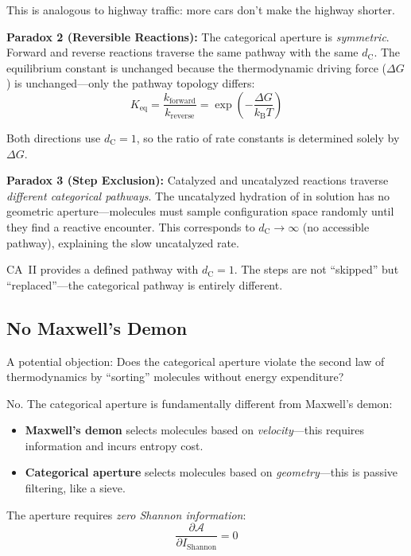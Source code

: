 \documentclass[twocolumn,amsmath,amssymb,aps,prb,superscriptaddress,longbibliography]{revtex4-2}
\newcommand{\dC}{d_{\mathrm{C}}}
\newcommand{\kB}{k_{\mathrm{B}}}
\newcommand{\calA}{\mathcal{A}}
\begin{document}
This is analogous to highway traffic: more cars don't make the highway shorter.

\textbf{Paradox 2 (Reversible Reactions):} The categorical aperture is \emph{symmetric}. Forward and reverse reactions traverse the same pathway with the same $\dC$. The equilibrium constant is unchanged because the thermodynamic driving force ($\Delta G$) is unchanged---only the pathway topology differs:
\begin{equation}
K_{\text{eq}} = \frac{k_{\text{forward}}}{k_{\text{reverse}}} = \exp\left(-\frac{\Delta G}{\kB T}\right)
\end{equation}

Both directions use $\dC = 1$, so the ratio of rate constants is determined solely by $\Delta G$.

\textbf{Paradox 3 (Step Exclusion):} Catalyzed and uncatalyzed reactions traverse \emph{different categorical pathways}. The uncatalyzed hydration of  in solution has no geometric aperture---molecules must sample configuration space randomly until they find a reactive encounter. This corresponds to $\dC \to \infty$ (no accessible pathway), explaining the slow uncatalyzed rate.

CA~II provides a defined pathway with $\dC = 1$. The steps are not ``skipped'' but ``replaced''---the categorical pathway is entirely different.

\subsection{No Maxwell's Demon}

A potential objection: Does the categorical aperture violate the second law of thermodynamics by ``sorting'' molecules without energy expenditure?

No. The categorical aperture is fundamentally different from Maxwell's demon:
\begin{itemize}
\item \textbf{Maxwell's demon} selects molecules based on \emph{velocity}---this requires information and incurs entropy cost.
\item \textbf{Categorical aperture} selects molecules based on \emph{geometry}---this is passive filtering, like a sieve.
\end{itemize}

The aperture requires \emph{zero Shannon information}:
\begin{equation}
\frac{\partial \calA}{\partial I_{\text{Shannon}}} = 0
\end{equation}
\end{document}
